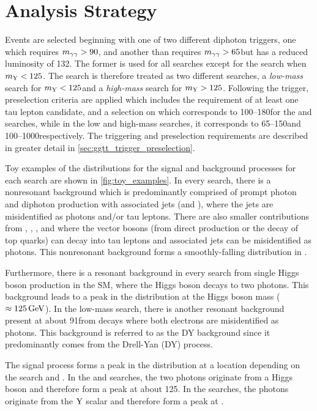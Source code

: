 \section{Analysis Strategy}\label{sec:ggtt_analysis strategy}

Events are selected beginning with one of two different diphoton triggers, one which requires $m_{\gamma\gamma} > 90$\GeV, and another than requires $m_{\gamma\gamma} > 65$\GeV but has a reduced luminosity of 132\fbinv. The former is used for all searches except for the \XYggHtt search when $m_{\mathrm{Y}}<125$\GeV. The \XYggHtt search is therefore treated as two different searches, a \textit{low-mass} search for $m_{\mathrm{Y}} < 125$\GeV and a \textit{high-mass} search for $m_{\mathrm{Y}} > 125$\GeV. Following the trigger, preselection criteria are applied which includes the requirement of at least one tau lepton candidate, and a selection on \mgg which corresponds to 100--180\GeV for the \XHH and \XYttHgg searches, while in the low and high-mass \XYggHtt searches, it corresponds to 65--150\GeV and 100--1000\GeV respectively. The triggering and preselection requirements are described in greater detail in \cref{sec:ggtt_trigger_preselection}. 

Toy examples of the \mgg distributions for the signal and background processes for each search are shown in \cref{fig:toy_examples}. In every search, there is a nonresonant background which is predominantly comprised of prompt photon and diphoton production with associated jets (\gjet and \ggjet), where the jets are misidentified as photons and/or tau leptons. There are also smaller contributions from \vgamma, \ttbar, \ttgamma, and \ttgammagamma where the vector bosons (from direct production or the decay of top quarks) can decay into tau leptons and associated jets can be misidentified as photons. This nonresonant background forms a smoothly-falling distribution in \mgg. 

Furthermore, there is a resonant background in every search from single Higgs boson production in the SM, where the Higgs boson decays to two photons. This background leads to a peak in the \mgg distribution at the Higgs boson mass ($\approx125\,\text{Ge\hspace{-.08em}V}$). In the low-mass \XYggHtt search, there is another resonant background present at about 91\GeV from \Zee decays where both electrons are misidentified as photons. This background is referred to as the DY background since it predominantly comes from the Drell-Yan (DY) process.

The signal process forms a peak in the \mgg distribution at a location depending on the search and \mY. In the \XHH and \XYttHgg searches, the two photons originate from a Higgs boson and therefore form a peak at about 125\GeV. In the \XYggHtt searches, the photons originate from the $\mathrm{Y}$ scalar and therefore form a peak at \mY. 

